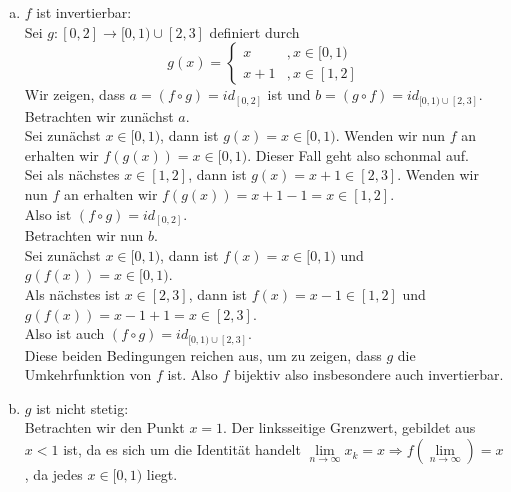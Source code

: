 \begin{enumerate}[(i)]
\begin{enumerate}[a)]
			Wir können also du beiden Bereiche $f_1 = f|_{[0,1)}$ und $f_2 = f|_{[2,3]}$ getrennt untersuchen.\\
			Dabei handelt es sich nun aber um 2 stetige Funktionen, da $f_1(x) = x$ und $f_2(x) = x-1$ ist.\\

			Damit kann es keinen Punkt geben, bei der die Folge der Bilder nicht gegen das Bild des Grenzwertes der Urbilder
			konvergiert.

\pagebreak

		\item $f$ ist invertierbar:\\
			Sei $g : [0,2] \rightarrow [0,1) \cup [2,3]$ definiert durch
			$$
				g(x) = \left\{\begin{array}{lr}
					x &, x\in [0,1)\\
					x+1 &, x \in [1,2]
				\end{array} \right.
			$$
			Wir zeigen, dass $a = (f \circ g) = id_{[0,2]}$ ist und $b = (g \circ f) = id_{[0,1) \cup [2,3]}$.\\

			Betrachten wir zunächst $a$.\\
			Sei zunächst $x \in [0,1)$, dann ist $g(x) = x \in [0,1)$. Wenden wir nun $f$ an erhalten wir $f(g(x)) = x \in [0,1)$.
			Dieser Fall geht also schonmal auf.\\

			Sei als nächstes $x \in [1,2]$, dann ist $g(x) = x+1 \in [2,3]$. Wenden wir nun $f$ an erhalten wir $f(g(x)) = x + 1 - 1 = x \in [1,2]$.\\

			Also ist $(f \circ g) = id_{[0,2]}$.\\

			Betrachten wir nun $b$.\\
			Sei zunächst $x \in [0,1)$, dann ist $f(x) = x \in [0,1)$ und $g(f(x)) = x \in [0,1)$.\\
			Als nächstes ist $x \in [2,3]$, dann ist $f(x) = x-1 \in [1,2]$ und $g(f(x)) = x -1 + 1 = x \in [2,3]$.\\

			Also ist auch $(f \circ g) = id_{[0,1) \cup [2,3]}$.\\

			Diese beiden Bedingungen reichen aus, um zu zeigen, dass $g$ die Umkehrfunktion von $f$ ist. Also $f$ bijektiv
			also insbesondere auch invertierbar.

		\item $g$ ist nicht stetig:\\
			Betrachten wir den Punkt $x = 1$. Der linksseitige Grenzwert, gebildet aus $x < 1$ ist, da es sich um die Identität handelt
			$\underset{n \rightarrow \infty}{\lim} x_k = x \Rightarrow f ( \underset{n \rightarrow \infty}{\lim} ) = x$, da jedes $x \in [0,1)$ liegt.\\


\end{enumerate}
\end{enumerate}
